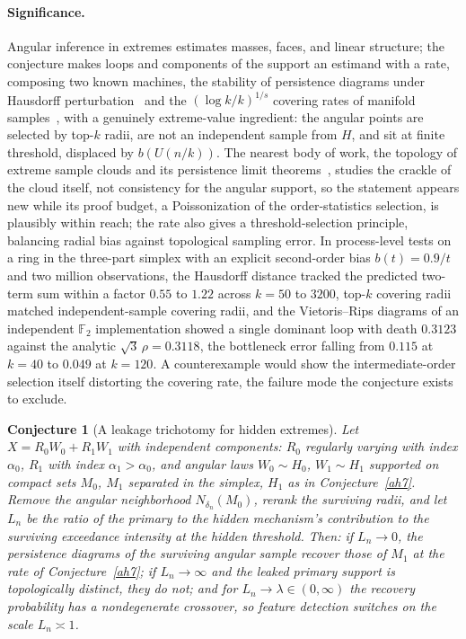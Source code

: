 \documentclass[11pt]{article}
\newtheorem{conjecture}{Conjecture}
\theoremstyle{definition}
\begin{document}
\paragraph{Significance.}
Angular inference in extremes estimates masses, faces, and linear structure; the conjecture makes loops and components of the support an estimand with a rate, composing two known machines, the stability of persistence diagrams under Hausdorff perturbation~\cite{CEH07} and the $(\log k/k)^{1/s}$ covering rates of manifold samples~\cite{NSW08,CGLM15}, with a genuinely extreme-value ingredient: the angular points are selected by top-$k$ radii, are not an independent sample from $H$, and sit at finite threshold, displaced by $b(U(n/k))$.  The nearest body of work, the topology of extreme sample clouds and its persistence limit theorems~\cite{Owa18}, studies the crackle of the cloud itself, not consistency for the angular support, so the statement appears new while its proof budget, a Poissonization of the order-statistics selection, is plausibly within reach; the rate also gives a threshold-selection principle, balancing radial bias against topological sampling error.  In process-level tests on a ring in the three-part simplex with an explicit second-order bias $b(t)=0.9/t$ and two million observations, the Hausdorff distance tracked the predicted two-term sum within a factor $0.55$ to $1.22$ across $k=50$ to $3200$, top-$k$ covering radii matched independent-sample covering radii, and the Vietoris--Rips diagrams of an independent $\mathbb F_2$ implementation showed a single dominant loop with death $0.3123$ against the analytic $\sqrt3\,\rho=0.3118$, the bottleneck error falling from $0.115$ at $k=40$ to $0.049$ at $k=120$.  A counterexample would show the intermediate-order selection itself distorting the covering rate, the failure mode the conjecture exists to exclude.

\begin{conjecture}[A leakage trichotomy for hidden extremes]\label{ah8}
Let $X=R_0W_0+R_1W_1$ with independent components: $R_0$ regularly varying with index $\alpha_0$, $R_1$ with index $\alpha_1>\alpha_0$, and angular laws $W_0\sim H_0$, $W_1\sim H_1$ supported on compact sets $M_0$, $M_1$ separated in the simplex, $H_1$ as in Conjecture~\ref{ah7}.  Remove the angular neighborhood $N_{\delta_n}(M_0)$, rerank the surviving radii, and let $L_n$ be the ratio of the primary to the hidden mechanism's contribution to the surviving exceedance intensity at the hidden threshold.  Then: if $L_n\to0$, the persistence diagrams of the surviving angular sample recover those of $M_1$ at the rate of Conjecture~\ref{ah7}; if $L_n\to\infty$ and the leaked primary support is topologically distinct, they do not; and for $L_n\to\lambda\in(0,\infty)$ the recovery probability has a nondegenerate crossover, so feature detection switches on the scale $L_n\asymp1$.
\end{conjecture}
\end{document}
